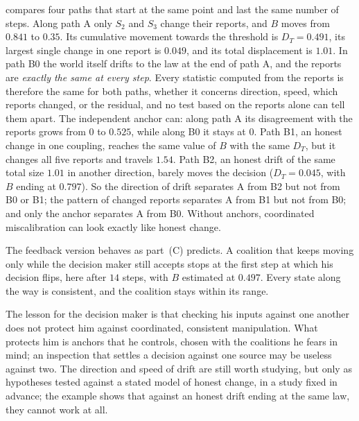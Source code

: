 \documentclass[11pt]{article}
\theoremstyle{definition}\newtheorem{definition}[theorem]{Definition}\newtheorem{remark}[theorem]{Remark}\newtheorem{example}[theorem]{Example}\newtheorem{problem}[theorem]{Open problem}\crefname{problem}{Problem}{Problems}
\begin{document}
 compares four paths that start at the same point and last the same number of steps. Along path A only $S_2$ and $S_3$ change their reports, and $B$ moves from $0.841$ to $0.35$. Its cumulative movement towards the threshold is $D_T=0.491$, its largest single change in one report is $0.049$, and its total displacement is $1.01$. In path B0 the world itself drifts to the law at the end of path A, and the reports are \emph{exactly the same at every step}. Every statistic computed from the reports is therefore the same for both paths, whether it concerns direction, speed, which reports changed, or the residual, and no test based on the reports alone can tell them apart. The independent anchor can: along path A its disagreement with the reports grows from $0$ to $0.525$, while along B0 it stays at $0$. Path B1, an honest change in one coupling, reaches the same value of $B$ with the same $D_T$, but it changes all five reports and travels $1.54$. Path B2, an honest drift of the same total size $1.01$ in another direction, barely moves the decision ($D_T=0.045$, with $B$ ending at $0.797$). So the direction of drift separates A from B2 but not from B0 or B1; the pattern of changed reports separates A from B1 but not from B0; and only the anchor separates A from B0. Without anchors, coordinated miscalibration can look exactly like honest change.

The feedback version behaves as part~(C) predicts. A coalition that keeps moving only while the decision maker still accepts stops at the first step at which his decision flips, here after $14$ steps, with $B$ estimated at $0.497$. Every state along the way is consistent, and the coalition stays within its range.

The lesson for the decision maker is that checking his inputs against one another does not protect him against coordinated, consistent manipulation. What protects him is anchors that he controls, chosen with the coalitions he fears in mind; an inspection that settles a decision against one source may be useless against two. The direction and speed of drift are still worth studying, but only as hypotheses tested against a stated model of honest change, in a study fixed in advance; the example shows that against an honest drift ending at the same law, they cannot work at all.
\end{document}
